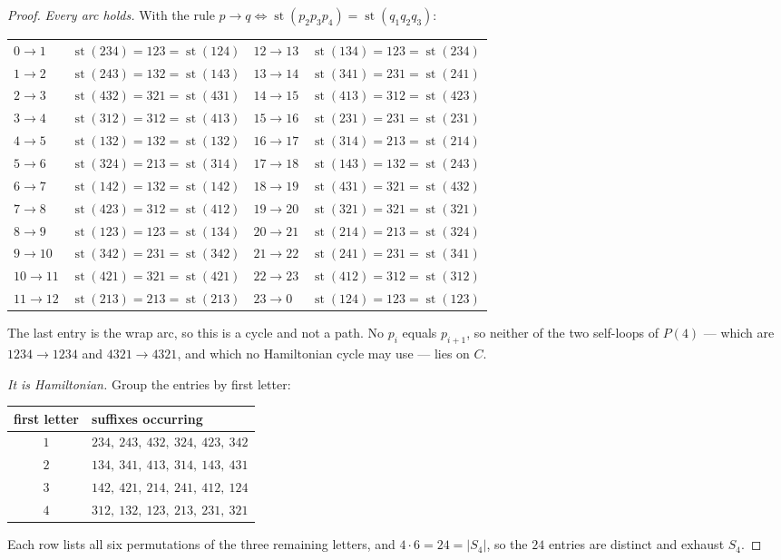 \documentclass[11pt]{amsart}
\DeclareMathOperator{\stt}{st}
\begin{document}
\begin{proof}
\emph{Every arc holds.} With the rule
$p\to q\iff\stt(p_2p_3p_4)=\stt(q_1q_2q_3)$:
\begin{center}\small
\begin{tabular}{@{}l@{\ }l@{\qquad}l@{\ }l@{}}
$0\to1$ & $\stt(234)=123=\stt(124)$ & $12\to13$ & $\stt(134)=123=\stt(234)$\\
$1\to2$ & $\stt(243)=132=\stt(143)$ & $13\to14$ & $\stt(341)=231=\stt(241)$\\
$2\to3$ & $\stt(432)=321=\stt(431)$ & $14\to15$ & $\stt(413)=312=\stt(423)$\\
$3\to4$ & $\stt(312)=312=\stt(413)$ & $15\to16$ & $\stt(231)=231=\stt(231)$\\
$4\to5$ & $\stt(132)=132=\stt(132)$ & $16\to17$ & $\stt(314)=213=\stt(214)$\\
$5\to6$ & $\stt(324)=213=\stt(314)$ & $17\to18$ & $\stt(143)=132=\stt(243)$\\
$6\to7$ & $\stt(142)=132=\stt(142)$ & $18\to19$ & $\stt(431)=321=\stt(432)$\\
$7\to8$ & $\stt(423)=312=\stt(412)$ & $19\to20$ & $\stt(321)=321=\stt(321)$\\
$8\to9$ & $\stt(123)=123=\stt(134)$ & $20\to21$ & $\stt(214)=213=\stt(324)$\\
$9\to10$ & $\stt(342)=231=\stt(342)$ & $21\to22$ & $\stt(241)=231=\stt(341)$\\
$10\to11$ & $\stt(421)=321=\stt(421)$ & $22\to23$ & $\stt(412)=312=\stt(312)$\\
$11\to12$ & $\stt(213)=213=\stt(213)$ & $23\to0$ & $\stt(124)=123=\stt(123)$
\end{tabular}
\end{center}
The last entry is the wrap arc, so this is a cycle and not a path. No $p_i$
equals $p_{i+1}$, so neither of the two self-loops of $P(4)$ --- which are
$1234\to1234$ and $4321\to4321$, and which no Hamiltonian cycle may use ---
lies on $C$.

\emph{It is Hamiltonian.} Group the entries by first letter:
\begin{center}\small
\begin{tabular}{c|l}
first letter & suffixes occurring\\\hline
$1$ & $234,\ 243,\ 432,\ 324,\ 423,\ 342$\\
$2$ & $134,\ 341,\ 413,\ 314,\ 143,\ 431$\\
$3$ & $142,\ 421,\ 214,\ 241,\ 412,\ 124$\\
$4$ & $312,\ 132,\ 123,\ 213,\ 231,\ 321$
\end{tabular}
\end{center}
Each row lists all six permutations of the three remaining letters, and
$4\cdot6=24=|S_4|$, so the $24$ entries are distinct and exhaust $S_4$.


\end{proof}
\end{document}
